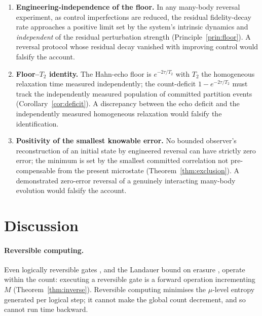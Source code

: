 \documentclass[11pt,a4paper]{article}
\theoremstyle{thmstyle}
\theoremstyle{definition}
\theoremstyle{remark}
\newcommand{\Ttwo}{T_{2}}
\newcommand{\Count}{M}
\newcommand{\Mic}{\mu}
\begin{document}
\begin{enumerate}[leftmargin=1.5em,itemsep=0.3em]
\item \textbf{Engineering-independence of the floor.} In any
many-body reversal experiment, as control imperfections are reduced, the
residual fidelity-decay rate approaches a positive limit set by the
system's intrinsic dynamics and \emph{independent} of the residual
perturbation strength (Principle~\ref{prin:floor}). A reversal protocol
whose residual decay vanished with improving control would falsify the
account.

\item \textbf{Floor--$\Ttwo$ identity.} The Hahn-echo floor is
$e^{-2\tau/\Ttwo}$ with $\Ttwo$ the homogeneous relaxation time measured
independently; the count-deficit $1-e^{-2\tau/\Ttwo}$ must track the
independently measured population of committed partition events
(Corollary~\ref{cor:deficit}). A discrepancy between the echo deficit and
the independently measured homogeneous relaxation would falsify the
identification.

\item \textbf{Positivity of the smallest knowable error.} No bounded
observer's reconstruction of an initial state by engineered reversal can
have strictly zero error; the minimum is set by the smallest committed
correlation not pre-compensable from the present microstate
(Theorem~\ref{thm:exclusion}). A demonstrated zero-error reversal of a
genuinely interacting many-body evolution would falsify the account.
\end{enumerate}

\section{Discussion}
\label{sec:discussion}

\paragraph{Reversible computing.} Even logically reversible gates
\citep{bennett1973}, and the Landauer bound on erasure
\citep{landauer1961}, operate within the count: executing a reversible
gate is a forward operation incrementing $\Count$
(Theorem~\ref{thm:inverse}). Reversible computing minimises the
$\Mic$-level entropy generated per logical step; it cannot make the
global count decrement, and so cannot run time backward.
\end{document}
